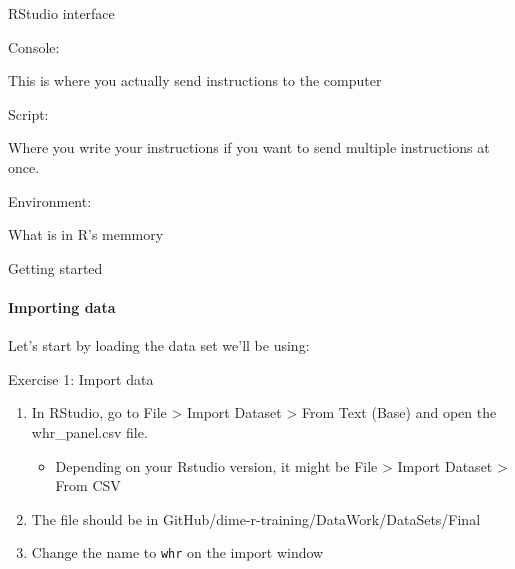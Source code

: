 \documentclass[ignorenonframetext,]{beamer}
\providecommand{\tightlist}{%
  \setlength{\itemsep}{0pt}\setlength{\parskip}{0pt}}
\begin{document}
\begin{frame}{RStudio interface}

\begin{block}{Console:}

This is where you actually send instructions to the computer

\end{block}

\begin{block}{Script:}

Where you write your instructions if you want to send multiple
instructions at once.

\end{block}

\begin{block}{Environment:}

What is in R's memmory

\end{block}

\end{frame}

\begin{frame}[fragile]{Getting started}

\framesubtitle{Importing data}

Let's start by loading the data set we'll be using:

\begin{block}{Exercise 1: Import data}

\begin{enumerate}
\def\labelenumi{\arabic{enumi}.}
\item
  In RStudio, go to File \textgreater{} Import Dataset \textgreater{}
  From Text (Base) and open the whr\_panel.csv file.

  \begin{itemize}
  \tightlist
  \item
    Depending on your Rstudio version, it might be File \textgreater{}
    Import Dataset \textgreater{} From CSV
  \end{itemize}
\item
  The file should be in GitHub/dime-r-training/DataWork/DataSets/Final
\item
  Change the name to \texttt{whr} on the import window
\end{enumerate}

\end{block}

\end{frame}
\end{document}
